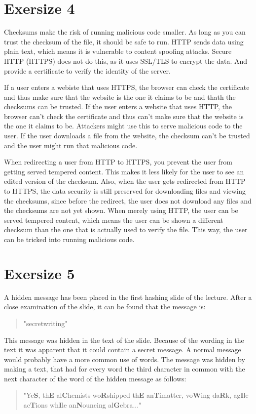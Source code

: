 \documentclass[twoside, a4paper, fleqn, reqno]{article}
\begin{document}
\section*{Exersize 4}
Checksums make the risk of running malicious code smaller. 
As long as you can trust the checksum of the file, it should be safe to run.
HTTP sends data using plain text, which means it is vulnerable to content spoofing attacks.
Secure HTTP (HTTPS) does not do this, as it uses SSL/TLS to encrypt the data.
And provide a certificate to verify the identity of the server.
\par If a user enters a webiste that uses HTTPS, the browser can check the certificate
and thus make sure that the website is the one it claims to be and thath the checksums can be trusted.
If the user enters a website that uses HTTP, the browser can't check the certificate and thus can't
make sure that the website is the one it claims to be. Attackers might use this to serve
malicious code to the user. If the user downloads a file from the website, the checksum can't be
trusted and the user might run that malicious code.
\par When redirecting a user from HTTP to HTTPS, you prevent the user from getting served
tempered content. This makes it less likely for the user to see an edited version of the
checksum. Also, when the user gets redirected from HTTP to HTTPS, the data security is still
preserved for downloading files and viewing the checksums, since before the redirect,
the user does not download any files and the checksums are not yet shown.
When merely using HTTP, the user can be served tempered content, which means the user
can be shown a different checksum than the one that is actually used to verify the file.
This way, the user can be tricked into running malicious code.

\section*{Exersize 5}
A hidden message has been placed in the first hashing slide of the lecture.
After a close examination of the slide, it can be found that the message is:
\begin{quote}
	"secretwriting"
\end{quote}
This message was hidden in the text of the slide. Because of the wording in the text
it was apparent that it could contain a secret message. A normal message would
probably have a more common use of words. The message was hidden by
making a text, that had for every word the third character in common with the next
character of the word of the hidden message as follows:
\begin{quote}
	"Ye\textbf{S}, th\textbf{E} al\textbf{C}hemists wo\textbf{R}shipped th\textbf{E}
	an\textbf{T}imatter, vo\textbf{W}ing da\textbf{R}k, 
	ag\textbf{I}le ac\textbf{T}ions wh\textbf{I}le an\textbf{N}ouncing al\textbf{G}ebra..."
\end{quote}
		
\end{document}
